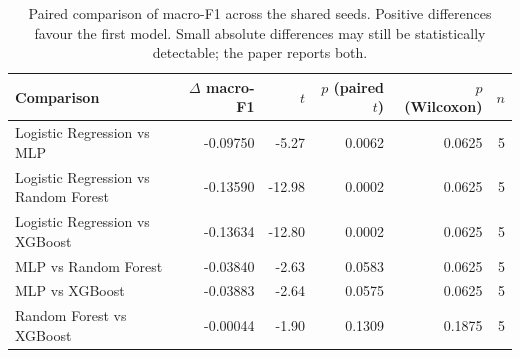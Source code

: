 \begin{table}[htbp]
\centering
\caption{Paired comparison of macro-F1 across the shared seeds. Positive differences favour the first model. Small absolute differences may still be statistically detectable; the paper reports both.}
\label{tab:paired}
\footnotesize
\begin{tabular}{lrrrrr}
\hline
Comparison & $\Delta$ macro-F1 & $t$ & $p$ (paired $t$) & $p$ (Wilcoxon) & $n$ \\
\hline
Logistic Regression vs MLP & -0.09750 & -5.27 & 0.0062 & 0.0625 & 5 \\
Logistic Regression vs Random Forest & -0.13590 & -12.98 & 0.0002 & 0.0625 & 5 \\
Logistic Regression vs XGBoost & -0.13634 & -12.80 & 0.0002 & 0.0625 & 5 \\
MLP vs Random Forest & -0.03840 & -2.63 & 0.0583 & 0.0625 & 5 \\
MLP vs XGBoost & -0.03883 & -2.64 & 0.0575 & 0.0625 & 5 \\
Random Forest vs XGBoost & -0.00044 & -1.90 & 0.1309 & 0.1875 & 5 \\
\hline
\end{tabular}
\end{table}
